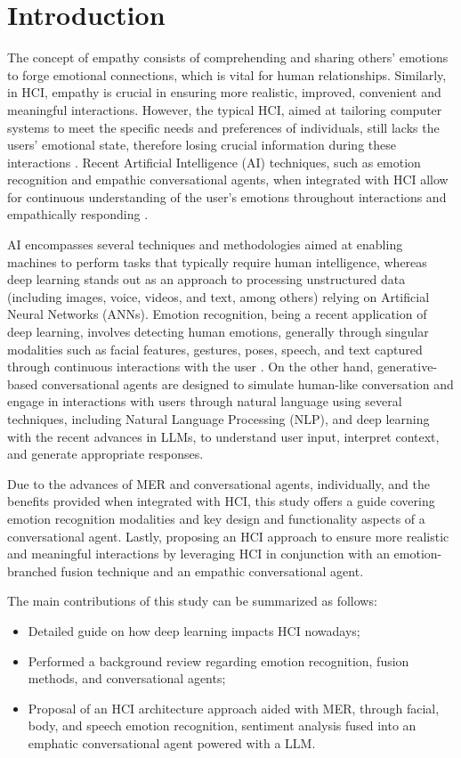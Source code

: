 \documentclass[runningheads]{llncs}
\begin{document}
\section{Introduction}

The concept of empathy consists of comprehending and sharing others' emotions to forge emotional connections, which is vital for human relationships. Similarly, in HCI, empathy is crucial in ensuring more realistic, improved, convenient and meaningful interactions. However, the typical HCI, aimed at tailoring computer systems to meet the specific needs and preferences of individuals, still lacks the users' emotional state, therefore losing crucial information during these interactions \cite{jaiswal_facial_2020}.  Recent Artificial Intelligence (AI) techniques, such as emotion recognition and empathic conversational agents, when integrated with HCI allow for continuous understanding of the user's emotions throughout interactions and empathically responding \cite{santos_approaches_2018}.

AI encompasses several techniques and methodologies aimed at enabling machines to perform tasks that typically require human intelligence, whereas deep learning stands out as an approach to processing unstructured data (including images, voice, videos, and text, among others) relying on Artificial Neural Networks (ANNs). Emotion recognition, being a recent application of deep learning, involves detecting human emotions, generally through singular modalities such as facial features, gestures, poses, speech, and text captured through continuous interactions with the user \cite{alrowais_modified_2023}. On the other hand, generative-based conversational agents are designed to simulate human-like conversation and engage in interactions with users through natural language using several techniques, including Natural Language Processing (NLP), and deep learning with the recent advances in LLMs, to understand user input, interpret context, and generate appropriate responses.

Due to the advances of MER and conversational agents, individually, and the benefits provided when integrated with HCI, this study offers a guide covering emotion recognition modalities and key design and functionality aspects of a conversational agent. Lastly, proposing an HCI approach to ensure more realistic and meaningful interactions by leveraging HCI in conjunction with an emotion-branched fusion technique and an empathic conversational agent.
 
The main contributions of this study can be summarized as follows:
\begin{itemize}
	\item Detailed guide on how deep learning impacts HCI nowadays;
	\item Performed a background review regarding emotion recognition, fusion methods, and conversational agents;
	\item  Proposal of an HCI architecture approach aided with MER, through facial, body, and speech emotion recognition, sentiment analysis fused into an emphatic conversational agent powered with a LLM.
\end{itemize}
\end{document}

